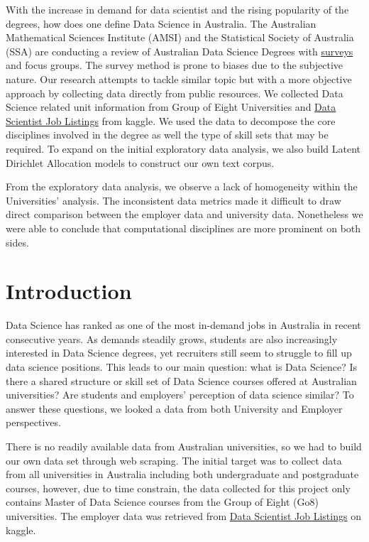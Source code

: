 \documentclass[
  letterpaper,
  DIV=11,
  numbers=noendperiod]{scrreport}
\begin{document}
With the increase in demand for data scientist and the rising popularity
of the degrees, how does one define Data Science in Australia. The
Australian Mathematical Sciences Institute (AMSI) and the Statistical
Society of Australia (SSA) are conducting a review of Australian Data
Science Degrees with
\href{https://amsi.org.au/amsi-ssa-data-science-review/}{surveys} and
focus groups. The survey method is prone to biases due to the subjective
nature. Our research attempts to tackle similar topic but with a more
objective approach by collecting data directly from public resources. We
collected Data Science related unit information from Group of Eight
Universities and
\href{(https://www.kaggle.com/code/nomilk/exploring-2-years-of-data-scientist-job-listings/data)}{Data
Scientist Job Listings} from kaggle. We used the data to decompose the
core disciplines involved in the degree as well the type of skill sets
that may be required. To expand on the initial exploratory data
analysis, we also build Latent Dirichlet Allocation models to construct
our own text corpus.

From the exploratory data analysis, we observe a lack of homogeneity
within the Universities' analysis. The inconsistent data metrics made it
difficult to draw direct comparison between the employer data and
university data. Nonetheless we were able to conclude that computational
disciplines are more prominent on both sides.


\hypertarget{introduction}{%
\chapter{Introduction}\label{introduction}}

Data Science has ranked as one of the most in-demand jobs in Australia
in recent consecutive years. As demands steadily grows, students are
also increasingly interested in Data Science degrees, yet recruiters
still seem to struggle to fill up data science positions. This leads to
our main question: what is Data Science? Is there a shared structure or
skill set of Data Science courses offered at Australian universities?
Are students and employers' perception of data science similar? To
answer these questions, we looked a data from both University and
Employer perspectives.

There is no readily available data from Australian universities, so we
had to build our own data set through web scraping. The initial target
was to collect data from all universities in Australia including both
undergraduate and postgraduate courses, however, due to time constrain,
the data collected for this project only contains Master of Data Science
courses from the Group of Eight (Go8) universities. The employer data
was retrieved from
\href{(https://www.kaggle.com/code/nomilk/exploring-2-years-of-data-scientist-job-listings/data)}{Data
Scientist Job Listings} on kaggle.
\end{document}
